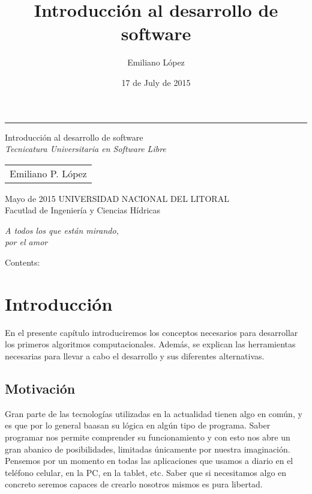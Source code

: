 \documentclass[a4paper,12pt,spanish]{sphinxmanual}
\title{Introducción al desarrollo de software}
\date{17 de July de 2015}
\author{Emiliano López}
\newcommand{\sphinxlogo}{}
\begin{document}

\begin{titlepage}%
    \let\footnotesize\small
    \let\footnoterule\relax
    \rule{\textwidth}{1pt}%
    \begin{flushright}%
      \sphinxlogo%
      \vspace{15 mm}
      {\rm\Huge Introducción al desarrollo de software\\ }
      {\em\large Tecnicatura Universitaria en Software Libre}
      \vfill
      {
        \begin{tabular}[t]{c}
          \large Emiliano P. López
        \end{tabular}
        \par}
      \vfill\vfill
      {\large
        Mayo de 2015
       \vfill
       UNIVERSIDAD NACIONAL DEL LITORAL\\
          Facutlad de Ingeniería y Ciencias Hídricas\\
      }%
    \end{flushright}%
  \end{titlepage}%
  \cleardoublepage%
  \label{pre:dedication}
  \vspace*{\fill}
  \begin{flushright}
    \emph{A todos los que están mirando,\\por el amor}
  \end{flushright}
  \vspace{\fill}

\tableofcontents
{}\label{index::doc}


Contents:


\chapter{Introducción}
\label{Unidad01:introduccion}\label{Unidad01::doc}\label{Unidad01:introduccion-al-desarrollo-de-software}
En el presente capítulo introduciremos los conceptos necesarios para
desarrollar los primeros algoritmos computacionales. Además, se explican
las herramientas necesarias para llevar a cabo el desarrollo y sus
diferentes alternativas.


\section{Motivación}
\label{Unidad01:motivacion}
Gran parte de las tecnologías utilizadas en la actualidad tienen algo en
común, y es que por lo general baasan su lógica en algún tipo de
programa. Saber programar nos permite comprender su funcionamiento y con
esto nos abre un gran abanico de posibilidades, limitadas únicamente por
nuestra imaginación. Pensemos por un momento en todas las aplicaciones
que usamos a diario en el teléfono celular, en la PC, en la tablet, etc.
Saber que si necesitamos algo en concreto seremos capaces de crearlo
nosotros mismos es pura libertad.
\end{document}
